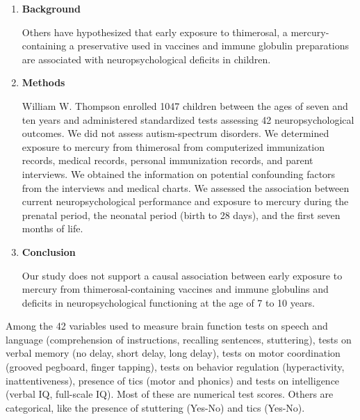 \documentclass[11pt, chapterprefix=true]{scrbook}\usepackage[]{graphicx}\usepackage[]{color}
\begin{document}
\begin{enumerate}

\item \textbf{Background}

Others have hypothesized that early exposure to thimerosal, a mercury-containing a preservative used in vaccines and immune globulin preparations are associated with neuropsychological deficits in children.

\item \textbf{Methods}

William W. Thompson enrolled 1047 children between the ages of seven and ten years and administered standardized tests assessing 42 neuropsychological outcomes. We did not assess autism-spectrum disorders. We determined exposure to mercury from thimerosal from computerized immunization records, medical records, personal immunization records, and parent interviews.  We obtained the information on potential confounding factors from the interviews and medical charts. We assessed the association between current neuropsychological performance and exposure to mercury during the prenatal period, the neonatal period (birth to 28 days), and the first seven months of life.

\item \textbf{Conclusion}

Our study does not support a causal association between early exposure to mercury from thimerosal-containing vaccines and immune globulins and deficits in neuropsychological functioning at the age of 7 to 10 years.
\end{enumerate}

Among the 42 variables used to measure brain function tests on speech and language (comprehension of instructions, recalling sentences, stuttering), tests on verbal memory (no delay, short delay, long delay), tests on motor coordination (grooved pegboard, finger tapping), tests on behavior regulation (hyperactivity, inattentiveness), presence of tics (motor and phonics) and tests on intelligence (verbal IQ, full-scale IQ).  Most of these are numerical test scores.  Others are categorical, like the presence of stuttering (Yes-No) and tics (Yes-No).
\end{document}
